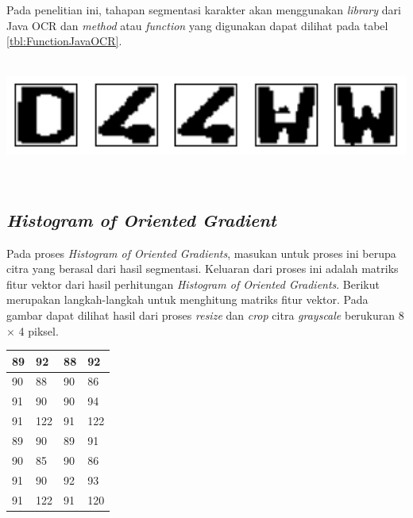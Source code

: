 \noindent Pada penelitian ini, tahapan segmentasi karakter akan menggunakan \textit{library} dari Java OCR dan \textit{method} atau \textit{function} yang digunakan dapat dilihat pada tabel \ref{tbl:FunctionJavaOCR}.\\
\\
\begin{adjustbox}{width=1\textwidth}
	\noindent\begin{minipage}{\linewidth}
		\centering\includegraphics[width=14cm]{images/OutputSegmentasi.png}
		\label{fig:OutputSegmentasi}
	\end{minipage}
\end{adjustbox}\\

\subsection{\textit{Histogram of Oriented Gradient}}
\noindent Pada proses \textit{Histogram of Oriented Gradients}, masukan untuk proses ini berupa citra yang berasal dari hasil segmentasi. Keluaran dari proses ini adalah matriks fitur vektor dari hasil perhitungan \textit{Histogram of Oriented Gradients}. Berikut merupakan langkah-langkah untuk menghitung matriks fitur vektor. Pada gambar dapat dilihat hasil dari proses \textit{resize} dan \textit{crop} citra \textit{grayscale} berukuran 8 $\times$ 4 piksel.

\begin{table}[H]
	\centering
	\begin{small}
		\begin{tabular}{|p{2cm}|p{2cm}|p{2cm}|p{2cm}|}
			\hline
			89 & 92 & 88 & 92 \\
			\hline
			90 & 88 & 90 & 86 \\
			\hline
			91 & 90 & 90 & 94 \\
			\hline
			91 & 122 & 91 & 122 \\
			\hline
			89 & 90 & 89 & 91 \\
			\hline
			90 & 85 & 90 & 86 \\
			\hline
			91 & 90 & 92 & 93 \\
			\hline
			91 & 122 & 91 & 120 \\
			\hline
		\end{tabular}
	\end{small}
	\label{fig:MatriksCitraHasilPreprocessing}
\end{table}

